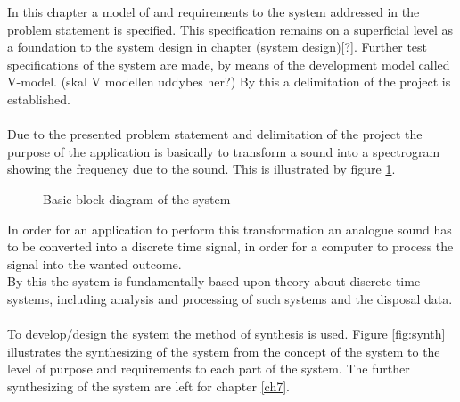 In this chapter a model of and requirements to the system addressed in the problem statement is specified. This specification remains on a superficial level as a foundation to the system design in chapter (system design)\ref{?}. Further test specifications of the system are made, by means of the development model called V-model. (skal V modellen uddybes her?) By this a delimitation of the project is established. \\   
\\
Due to the presented problem statement and delimitation of the project the purpose of the application is basically to transform a sound into a spectrogram showing the frequency due to the sound. This is illustrated by figure \ref{fig:model1}.    
\begin{figure}[h]
\centering
{}
\caption{Basic block-diagram of the system}
\label{fig:model1}
\end{figure}
In order for an application to perform this transformation an analogue sound has to be converted into a discrete time signal, in order for a computer to process the signal into the wanted outcome. \\
By this the system is fundamentally based upon theory about discrete time systems, including analysis and processing of such systems and the disposal data. \\
\\
To develop/design the system the method of synthesis is used. Figure \ref{fig:synth} illustrates the synthesizing of the system from the concept of the system to the level of purpose and requirements to each part of the system. The further synthesizing of the system are left for chapter \ref{ch7}. 

